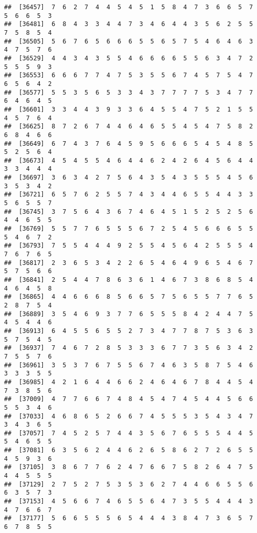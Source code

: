 \documentclass[
]{book}
\begin{document}
\begin{verbatim}
##  [36457]  7  6  2  7  4  4  5  4  5  1  5  8  4  7  3  6  6  5  7  5  6  6  5  3
##  [36481]  6  8  4  3  3  4  4  7  3  4  6  4  4  3  5  6  2  5  5  7  5  8  5  4
##  [36505]  5  6  7  6  5  6  6  6  5  5  6  5  7  5  4  6  4  6  3  4  7  5  7  6
##  [36529]  4  4  3  4  3  5  5  4  6  6  6  6  5  5  6  3  4  7  2  5  5  5  9  3
##  [36553]  6  6  6  7  7  4  7  5  3  5  5  6  7  4  5  7  5  4  7  6  5  6  4  2
##  [36577]  5  5  3  5  6  5  3  3  4  3  7  7  7  7  5  3  4  7  7  6  4  6  4  5
##  [36601]  3  3  4  4  3  9  3  3  6  4  5  5  4  7  5  2  1  5  5  4  5  7  6  4
##  [36625]  8  7  2  6  7  4  4  6  4  6  5  5  4  5  4  7  5  8  2  6  8  4  6  6
##  [36649]  6  7  4  3  7  6  4  5  9  5  6  6  6  5  4  5  4  8  5  5  2  5  6  4
##  [36673]  4  5  4  5  5  4  6  4  4  6  2  4  2  6  4  5  6  4  4  3  3  4  4  4
##  [36697]  3  6  3  4  2  7  5  6  4  3  5  4  3  5  5  5  4  5  6  3  5  3  4  2
##  [36721]  6  5  7  6  2  5  5  7  4  3  4  4  6  5  5  4  4  3  3  5  6  5  5  7
##  [36745]  3  7  5  6  4  3  6  7  4  6  4  5  1  5  2  5  2  5  6  4  4  6  5  5
##  [36769]  5  5  7  7  6  5  5  5  6  7  2  5  4  5  6  6  6  5  5  5  4  6  7  2
##  [36793]  7  5  5  4  4  4  9  2  5  5  4  5  6  4  2  5  5  5  4  7  6  7  6  5
##  [36817]  2  3  6  5  3  4  2  2  6  5  4  6  4  9  6  5  4  6  7  5  7  5  6  6
##  [36841]  2  5  4  4  7  8  6  3  6  1  4  6  7  3  8  6  8  5  4  4  6  4  5  8
##  [36865]  4  4  6  6  6  8  5  6  6  5  7  5  6  5  5  7  7  6  5  2  8  7  5  4
##  [36889]  3  5  4  6  9  3  7  7  6  5  5  5  8  4  2  4  4  7  5  4  5  4  4  6
##  [36913]  6  4  5  5  6  5  5  2  7  3  4  7  7  8  7  5  3  6  3  5  7  5  4  5
##  [36937]  7  4  6  7  2  8  5  3  3  3  6  7  7  3  5  6  3  4  2  7  5  5  7  6
##  [36961]  3  5  3  7  6  7  5  5  6  7  4  6  3  5  8  7  5  4  6  3  3  3  5  5
##  [36985]  4  2  1  6  4  4  6  6  2  4  6  4  6  7  8  4  4  5  4  7  3  8  5  6
##  [37009]  4  7  7  6  6  7  4  8  4  5  4  7  4  5  4  4  5  6  6  5  5  3  4  6
##  [37033]  4  6  8  6  5  2  6  6  7  4  5  5  5  3  5  4  3  4  7  3  4  3  6  5
##  [37057]  7  4  5  2  5  7  4  4  3  5  6  7  6  5  5  5  4  4  5  5  4  6  5  5
##  [37081]  6  3  5  6  2  4  4  6  2  6  5  8  6  2  7  2  6  5  5  4  5  9  3  6
##  [37105]  3  8  6  7  7  6  2  4  7  6  6  7  5  8  2  6  4  7  5  4  4  5  5  5
##  [37129]  2  7  5  2  7  5  3  5  3  6  2  7  4  4  6  6  5  5  6  6  3  5  7  3
##  [37153]  4  5  6  6  7  4  6  5  5  6  4  7  3  5  5  4  4  4  3  4  7  6  6  7
##  [37177]  5  6  6  5  5  5  6  5  4  4  4  3  8  4  7  3  6  5  7  6  7  8  5  5

\end{verbatim}
\end{document}
